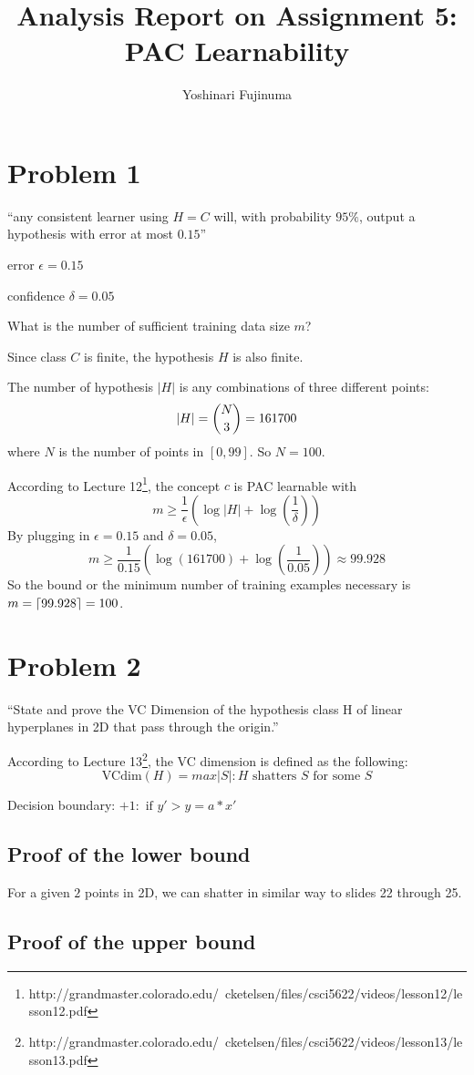 \documentclass[11pt]{article}
\DeclarePairedDelimiter\ceil{\lceil}{\rceil}
\begin{document}
\title{Analysis Report on Assignment 5: PAC Learnability}
\author{Yoshinari Fujinuma}
\date{}
\maketitle

\section{Problem 1}
``any consistent learner using $H=C$ will, with probability $95\%$, output a hypothesis with error at most $0.15$''

error $\epsilon = 0.15$

confidence $\delta = 0.05$

What is the number of sufficient training data size $m$?

Since class $C$ is finite, the hypothesis $H$ is also finite.

The number of hypothesis $|H|$ is any combinations of three different points:
$$
|H| = \dbinom{N}{3} = 161700
$$
where $N$ is the number of points in $[0, 99]$. So $N = 100$.

According to Lecture 12\footnote{http://grandmaster.colorado.edu/~cketelsen/files/csci5622/videos/lesson12/lesson12.pdf}, the concept $c$ is PAC learnable with 
$$
m \geq \frac{1}{\epsilon}(\log |H| + \log(\frac{1}{\delta}))
$$
By plugging in $\epsilon = 0.15$ and $\delta = 0.05$, 
$$
m \geq \frac{1}{0.15}(\log(161700) + \log(\frac{1}{0.05})) \approx 99.928
$$
So the bound or the minimum number of training examples necessary is $m = \ceil{99.928} = 100$.


\section{Problem 2}
``State and prove the VC Dimension of the hypothesis class H of linear hyperplanes in 2D that pass through the origin.''

According to Lecture 13\footnote{http://grandmaster.colorado.edu/~cketelsen/files/csci5622/videos/lesson13/lesson13.pdf}, the VC dimension is defined as the following:
$$
\mbox{VCdim}(H) = max{|S|: H \mbox{ shatters } S \mbox{ for some } S}
$$

Decision boundary: $ +1 : \mbox{ if }y' > y = a * x'$

\subsection{Proof of the lower bound}

For a given $2$ points in 2D, we can shatter in similar way to slides 22 through 25.

\subsection{Proof of the upper bound}
\end{document}
